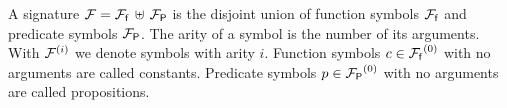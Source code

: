 
\begin{definition}\label{def:signature}
A {\myem signature} ${\mathcal F}={{\mathcal F}_{\mathsf f}}\,\uplus\,{{\mathcal F}_{\mathsf P}}$ is the disjoint union of {\myem function symbols} ${{\mathcal F}_{\mathsf f}}$
and {\myem predicate symbols} ${{\mathcal F}_{\mathsf P}}$.
The {\myem arity} of a symbol is the number of its arguments.
With ${\mathcal F}^{(i)}$ we denote symbols with arity $i$.
Function symbols $c\in{{\mathcal F}_{\mathsf f}}^{(0)}$ with no arguments are called {\myem constants}.
Predicate symbols $p\in{{\mathcal F}_{\mathsf P}}^{(0)}$ with no arguments are called propositions. 
\end{definition}

